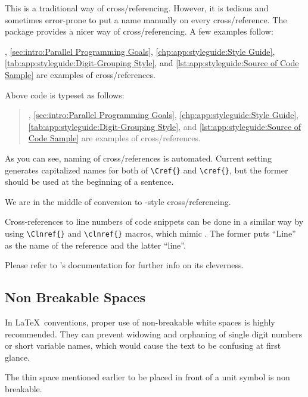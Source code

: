 This is a traditional way of cross\-/referencing.
However, it is tedious and sometimes error-prone to put a name
manually on every cross\-/reference.
The  package provides a nicer way of cross\-/referencing.
A few examples follow:

\begin{VerbatimN}
,
\cref{sec:intro:Parallel Programming Goals},
\cref{chp:app:styleguide:Style Guide},
\cref{tab:app:styleguide:Digit-Grouping Style}, and
\cref{lst:app:styleguide:Source of Code Sample} are
examples of cross\-/references.
\end{VerbatimN}

Above code is typeset as follows:

\begin{quote}
,
\cref{sec:intro:Parallel Programming Goals},
\cref{chp:app:styleguide:Style Guide},
\cref{tab:app:styleguide:Digit-Grouping Style}, and
\cref{lst:app:styleguide:Source of Code Sample} are
examples of cross\-/references.
\end{quote}

As you can see, naming of cross\-/references is automated.
Current setting generates capitalized names for both of
\verb|\Cref{}| and \verb|\cref{}|, but the former
should be used at the beginning of a sentence.

We are in the middle of conversion to
-style cross\-/referencing.

Cross-references to line numbers of code snippets
can be done in a similar way by using \verb|\Clnref{}| and
\verb|\clnref{}| macros, which mimic .
The former puts ``Line'' as the name of the reference
and the latter ``line''.

Please refer to 's documentation for further
info on its cleverness.

\subsection{Non Breakable Spaces}
\label{sec:app:styleguide:Non Breakable Spaces}

In \LaTeX\ conventions, proper use of non-breakable white spaces
is highly recommended.
They can prevent widowing and orphaning of single digit numbers
or short variable names, which would cause the text to be confusing
at first glance.

The thin space mentioned earlier to be placed in front of a unit
symbol is non breakable.

